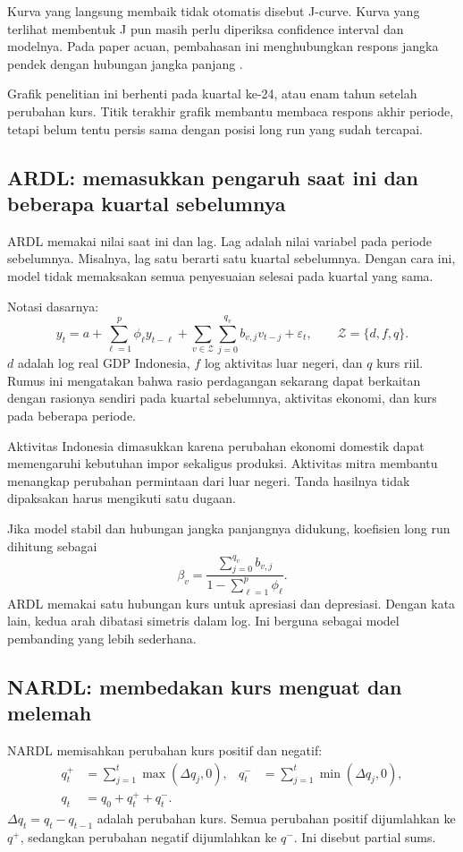 Kurva yang langsung membaik tidak otomatis disebut J-curve. Kurva yang terlihat membentuk J pun masih perlu diperiksa confidence interval dan modelnya. Pada paper acuan, pembahasan ini menghubungkan respons jangka pendek dengan hubungan jangka panjang \cite{bahmani}.

Grafik penelitian ini berhenti pada kuartal ke-24, atau enam tahun setelah perubahan kurs. Titik terakhir grafik membantu membaca respons akhir periode, tetapi belum tentu persis sama dengan posisi long run yang sudah tercapai.

\subsection{ARDL: memasukkan pengaruh saat ini dan beberapa kuartal sebelumnya}
ARDL memakai nilai saat ini dan lag. Lag adalah nilai variabel pada periode sebelumnya. Misalnya, lag satu berarti satu kuartal sebelumnya. Dengan cara ini, model tidak memaksakan semua penyesuaian selesai pada kuartal yang sama.

Notasi dasarnya:
\begin{equation}
 y_t=a+\sum_{\ell=1}^{p}\phi_\ell y_{t-\ell}
       +\sum_{v\in\mathcal Z}\sum_{j=0}^{q_v}b_{v,j}v_{t-j}+\varepsilon_t,
 \qquad \mathcal Z=\{d,f,q\}.\label{eq:ardl}
\end{equation}
$d$ adalah log real GDP Indonesia, $f$ log aktivitas luar negeri, dan $q$ kurs riil. Rumus ini mengatakan bahwa rasio perdagangan sekarang dapat berkaitan dengan rasionya sendiri pada kuartal sebelumnya, aktivitas ekonomi, dan kurs pada beberapa periode.

Aktivitas Indonesia dimasukkan karena perubahan ekonomi domestik dapat memengaruhi kebutuhan impor sekaligus produksi. Aktivitas mitra membantu menangkap perubahan permintaan dari luar negeri. Tanda hasilnya tidak dipaksakan harus mengikuti satu dugaan.

Jika model stabil dan hubungan jangka panjangnya didukung, koefisien long run dihitung sebagai
\begin{equation}
 \beta_v=\frac{\sum_{j=0}^{q_v}b_{v,j}}{1-\sum_{\ell=1}^{p}\phi_\ell}.
 \label{eq:lr}
\end{equation}
ARDL memakai satu hubungan kurs untuk apresiasi dan depresiasi. Dengan kata lain, kedua arah dibatasi simetris dalam log. Ini berguna sebagai model pembanding yang lebih sederhana.

\subsection{NARDL: membedakan kurs menguat dan melemah}
NARDL memisahkan perubahan kurs positif dan negatif:
\begin{align}
 q_t^+&=\sum_{j=1}^{t}\max(\Delta q_j,0),&
 q_t^-&=\sum_{j=1}^{t}\min(\Delta q_j,0),\\
 q_t&=q_0+q_t^++q_t^-.
\end{align}
$\Delta q_t=q_t-q_{t-1}$ adalah perubahan kurs. Semua perubahan positif dijumlahkan ke $q^+$, sedangkan perubahan negatif dijumlahkan ke $q^-$. Ini disebut partial sums.


